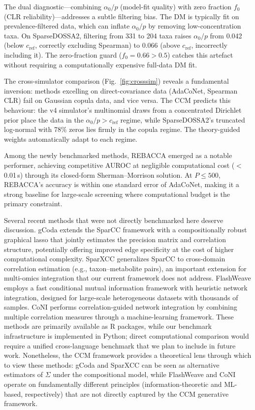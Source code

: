 \documentclass[unnumsec,webpdf,contemporary,large,numbered]{oup-authoring-template}
\theoremstyle{plain}
\theoremstyle{definition}
\begin{document}
The dual diagnostic---combining $\alpha_0/p$ (model-fit quality) with zero fraction $f_0$ (CLR reliability)---addresses a subtle filtering bias. The DM is typically fit on prevalence-filtered data, which can inflate $\alpha_0/p$ by removing low-concentration taxa. On SparseDOSSA2, filtering from 331 to 204 taxa raises $\alpha_0/p$ from 0.042 (below $c_{\text{ref}}$, correctly excluding Spearman) to 0.066 (above $c_{\text{ref}}$, incorrectly including it). The zero-fraction guard ($f_0 = 0.66 > 0.5$) catches this artefact without requiring a computationally expensive full-data DM fit.

The cross-simulator comparison (Fig.~\ref{fig:crosssim}) reveals a fundamental inversion: methods excelling on direct-covariance data (AdaCoNet, Spearman CLR) fail on Gaussian copula data, and vice versa. The CCM predicts this behaviour: the v4 simulator's multinomial draws from a concentrated Dirichlet prior place the data in the $\alpha_0/p > c_{\text{ref}}$ regime, while SparseDOSSA2's truncated log-normal with 78\% zeros lies firmly in the copula regime. The theory-guided weights automatically adapt to each regime.

Among the newly benchmarked methods, REBACCA emerged as a notable performer, achieving competitive AUROC at negligible computational cost ($<$0.01\,s) through its closed-form Sherman--Morrison solution. At $P \leq 500$, REBACCA's accuracy is within one standard error of AdaCoNet, making it a strong baseline for large-scale screening where computational budget is the primary constraint.

Several recent methods that were not directly benchmarked here deserve discussion. gCoda \cite{fang2017} extends the SparCC framework with a compositionally robust graphical lasso that jointly estimates the precision matrix and correlation structure, potentially offering improved edge specificity at the cost of higher computational complexity. SparXCC \cite{jensen2024} generalizes SparCC to cross-domain correlation estimation (e.g., taxon--metabolite pairs), an important extension for multi-omics integration that our current framework does not address. FlashWeave \cite{tackmann2019} employs a fast conditional mutual information framework with heuristic network integration, designed for large-scale heterogeneous datasets with thousands of samples. CoNI \cite{klaus2022} performs correlation-guided network integration by combining multiple correlation measures through a machine-learning framework. These methods are primarily available as R packages, while our benchmark infrastructure is implemented in Python; direct computational comparison would require a unified cross-language benchmark that we plan to include in future work. Nonetheless, the CCM framework provides a theoretical lens through which to view these methods: gCoda and SparXCC can be seen as alternative estimators of $\Sigma$ under the compositional model, while FlashWeave and CoNI operate on fundamentally different principles (information-theoretic and ML-based, respectively) that are not directly captured by the CCM generative framework.
\end{document}
